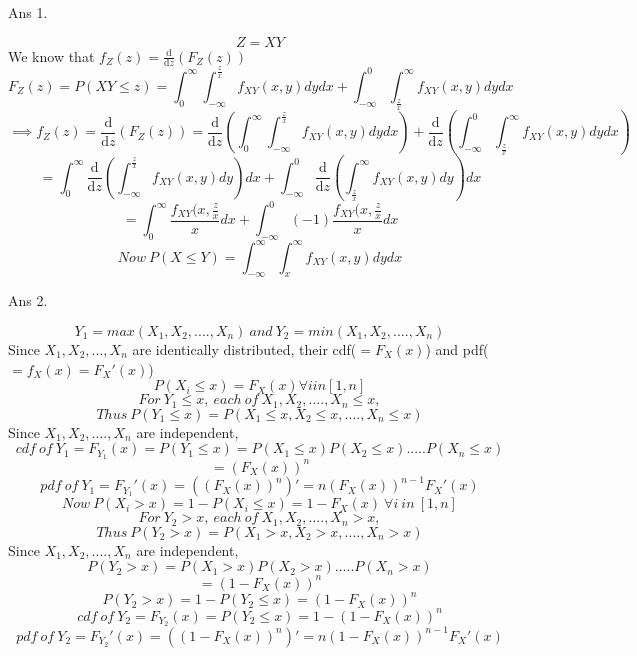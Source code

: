 \documentclass[11pt]{article}
\begin{document}
\maketitle

Ans 1.\begin{center}
$$Z=XY$$
We know that $f_Z(z) = \frac{\text{d}}{\text{d}z}(F_Z(z))$
$$F_Z(z) =P(XY \le z)= \int_{0}^{\infty}\int_{-\infty}^{\frac{z}{x}}f_{XY}(x,y)dydx + \int_{-\infty}^{0}\int_{\frac{z}{x}}^{\infty}f_{XY}(x,y)dydx$$
$$\implies f_Z(z)=\frac{\text{d}}{\text{d}z}(F_Z(z))=\frac{\text{d}}{\text{d}z}(\int_{0}^{\infty}\int_{-\infty}^{\frac{z}{x}}f_{XY}(x,y)dydx)+\frac{\text{d}}{\text{d}z}(\int_{-\infty}^{0}\int_{\frac{z}{x}}^{\infty}f_{XY}(x,y)dydx)$$
$$=\int_{0}^{\infty}\frac{\text{d}}{\text{d}z}(\int_{-\infty}^{\frac{z}{x}}f_{XY}(x,y)dy)dx+\int_{-\infty}^{0}\frac{\text{d}}{\text{d}z}(\int_{\frac{z}{x}}^{\infty}f_{XY}(x,y)dy)dx$$
$$=\int_{0}^{\infty}\frac{f_{XY}(x,\frac{z}{x}}{x}dx + \int_{-\infty}^{0}(-1)\frac{f_{XY}(x,\frac{z}{x}}{x}dx$$
$$Now\ P(X \le Y) = \int_{-\infty}^{\infty}\int_{x}^{\infty}f_{XY}(x,y)dydx$$
\newline
\newline
\end{center}

Ans 2.\begin{center}
$$Y_1=max(X_1,X_2,....,X_n)\ and\ Y_2=min(X_1,X_2,....,X_n)$$
Since $X_1,X_2,...,X_n$ are identically distributed, their cdf($=F_X(x)$) and pdf($=f_X(x) = F_X'(x)$)
$$P(X_i \le x) = F_X(x) \forall i in [1,n]$$
$$For\ Y_1 \le x,\ each\ of\ X_1,X_2,....,X_n \le x,$$
$$Thus\ P(Y_1\le x) = P(X_1\le x,X_2\le x,....,X_n \le x)$$
Since $X_1,X_2,....,X_n$ are independent,
$$cdf\ of\ Y_1 = F_{Y_1}(x) = P(Y_1 \le x) = P(X_1 \le x)P(X_2 \le x).....P(X_n \le x)$$
$$=(F_X(x))^n$$
$$pdf\ of\ Y_1 = F_{Y_1}'(x) = ((F_X(x))^n)' = n(F_X(x))^{n-1}F_X'(x)$$
\linebreak
$$Now\ P(X_i > x) = 1 - P(X_i \le x) = 1 - F_X(x)\ \forall i\ in\ [1,n]$$
$$For\ Y_2 > x,\ each\ of\ X_1,X_2,....,X_n > x,$$
$$Thus\ P(Y_2 > x) = P(X_1> x,X_2> x,....,X_n > x)$$
Since $X_1,X_2,....,X_n$ are independent,
$$P(Y_2 > x) = P(X_1 > x)P(X_2 > x).....P(X_n > x)$$
$$=(1 - F_X(x))^n$$
$$P(Y_2 > x) = 1 - P(Y_2 \le x) =(1 - F_X(x))^n$$
$$cdf\ of\ Y_2 = F_{Y_2}(x)=P(Y_2 \le x) = 1 - (1 - F_X(x))^n$$
$$pdf\ of\ Y_2 = F_{Y_2}'(x) = ((1 - F_X(x))^n)' = n(1 - F_X(x))^{n-1}F_X'(x)$$
\newline
\newline
\end{center}
\end{document}
